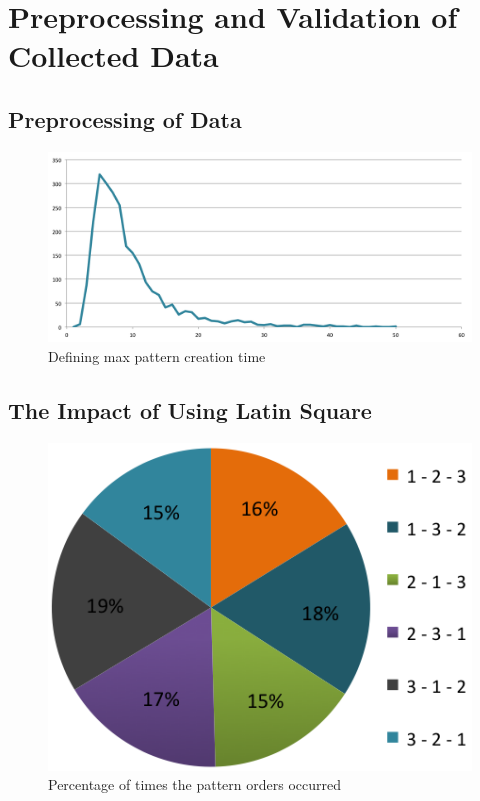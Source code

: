 \section{Preprocessing and Validation of Collected Data} \label{sec:preprocessvalidate}

  

	\subsection{Preprocessing of Data}

    \begin{figure}[H]
      \centering
      \includegraphics[width=\textwidth]{pics/analysis/limittimeframe.png}
      \caption{Defining max pattern creation time}
    \end{figure}

	\subsection{The Impact of Using Latin Square} \label{sec:latinsquareimpact}


		\begin{figure}[H]
      \centering
      \includegraphics[scale=0.5]{pics/analysis/patternOrder.png}
      \caption{Percentage of times the pattern orders occurred}
      \label{fig:patternOrder}
    \end{figure}
